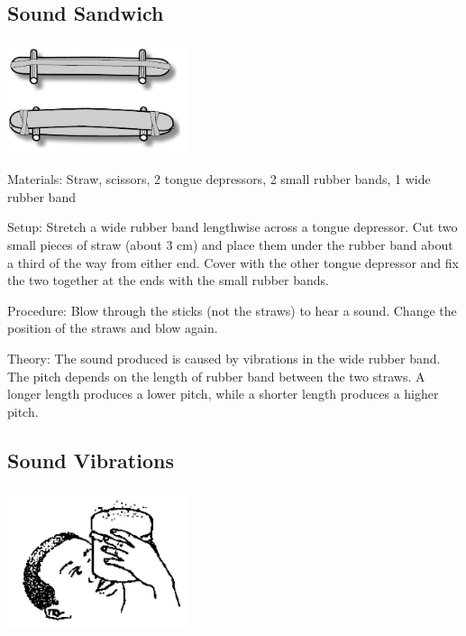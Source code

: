 \begin{multicols}{2}
\columnbreak

\subsection{Sound Sandwich}

\begin{center}
\includegraphics[width=0.4\textwidth]{./img/sound-sandwich.jpg}
\end{center}

\begin{description*}
\item[Materials:]{Straw, scissors, 2 tongue depressors, 2 small rubber bands, 1 wide rubber band}
\item[Setup:]{Stretch a wide rubber band lengthwise across a tongue depressor. Cut two small pieces of straw (about 3 cm) and place them under the rubber band about a third of the way from either end. Cover with the other tongue depressor and fix the two together at the ends with the small rubber bands.}
\item[Procedure:]{Blow through the sticks (not the straws) to hear a sound. Change the position of the straws and blow again.}
\item[Theory:]{The sound produced is caused by vibrations in the wide rubber band. The pitch depends on the length of rubber band between the two straws. A longer length produces a lower pitch, while a shorter length produces a higher pitch.}
\end{description*}

\subsection{Sound Vibrations}

\begin{center}
\includegraphics[width=0.4\textwidth]{./img/source/sound-vibrations.png}
\end{center}


\end{multicols}
